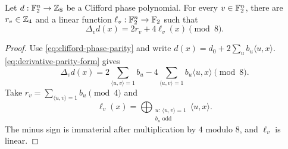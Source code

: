 \begin{theorem}
    \label{thm:clifford-phase-derivative}
    Let $d:\mathbb{F}_2^n\to\mathbb{Z}_8$ be a Clifford phase polynomial.  For every
    $v\in\mathbb{F}_2^n$, there are $r_v\in\mathbb{Z}_4$ and a linear function
    \(\ell_v:\mathbb{F}_2^n\to\mathbb{F}_2\) such that
    \begin{equation}
        \label{eq:clifford-phase-derivative}
        \Delta_vd(x)=2r_v+4\ell_v(x)\pmod 8.
    \end{equation}
\end{theorem}

\begin{proof}
    Use \cref{eq:clifford-phase-parity} and write
    $d(x)=d_0+2\sum_u b_u\langle u,x\rangle$.
    \cref{eq:derivative-parity-form} gives
    \[
        \Delta_vd(x)
        =2\sum_{\langle u,v\rangle=1}b_u
        -4\sum_{\langle u,v\rangle=1}b_u\langle u,x\rangle
        \pmod 8.
    \]
    Take $r_v=\sum_{\langle u,v\rangle=1}b_u\pmod4$ and
    \[
        \ell_v(x)=
        \bigoplus_{\substack{u:\,\langle u,v\rangle=1\\ b_u\text{ odd}}}
        \langle u,x\rangle.
    \]
    The minus sign is immaterial after multiplication by $4$ modulo $8$,
    and \(\ell_v\) is linear.
\end{proof}
